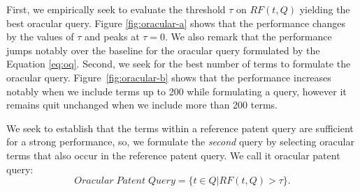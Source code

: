 First, we empirically seek to evaluate the threshold $\tau$ on $RF(t,Q)$ yielding the best oracular query.
Figure \ref{fig:oracular-a} shows that the performance changes by the values of $\tau$ and peaks at $\tau=0$. We also remark that the performance jumps notably over the baseline for the oracular query formulated by the Equation \ref{eq:oq}. Second, we seek for the best number of terms to formulate the oracular query. 
Figure~\ref{fig:oracular-b} shows that the performance increases notably when we include terms up to 200 while formulating a query, however it remains quit unchanged when we include more than 200 terms. 

We seek to establish that the terms within a reference patent query are sufficient for a strong performance, so, we formulate the \textit{second} query by selecting oracular terms that also occur in the reference patent query. We call it oracular patent query:
\begin{equation}
 Oracular \; Patent \; Query = \{t\in Q|RF(t, Q)>\tau\}.   
 \label{eq:score}
\end{equation}
